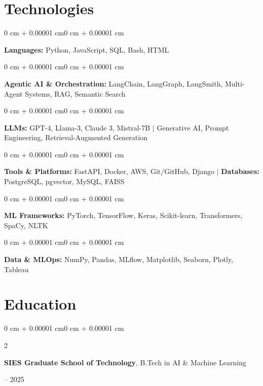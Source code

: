 \documentclass[10pt, letterpaper]{article}
\newenvironment{onecolentry}{
    \begin{adjustwidth}{0 cm + 0.00001 cm}{0 cm + 0.00001 cm}
}{
    \end{adjustwidth}
}
\newenvironment{twocolentry}[2][]{
    \onecolentry
    \def\secondColumn{#2}
    \setcolumnwidth{\fill, 4.5 cm}
    \begin{paracol}{2}
}{
    \switchcolumn \raggedleft \secondColumn
    \end{paracol}
    \endonecolentry
}
\begin{document}
    \section{Technologies}

        \begin{onecolentry}
            \textbf{Languages:} Python, JavaScript, SQL, Bash, HTML
        \end{onecolentry}
        \vspace{0.06 cm}
        \begin{onecolentry}
            \textbf{Agentic AI \& Orchestration:} LangChain, LangGraph, LangSmith, Multi-Agent Systems, RAG, Semantic Search
        \end{onecolentry}
        \vspace{0.06 cm}
        \begin{onecolentry}
            \textbf{LLMs:} GPT-4, Llama-3, Claude 3, Mistral-7B $|$ Generative AI, Prompt Engineering, Retrieval-Augmented Generation
        \end{onecolentry}
        \vspace{0.06 cm}
        \begin{onecolentry}
            \textbf{Tools \& Platforms:} FastAPI, Docker, AWS, Git/GitHub, Django $|$ \textbf{Databases:} PostgreSQL, pgvector, MySQL, FAISS
        \end{onecolentry}
        \vspace{0.06 cm}
        \begin{onecolentry}
            \textbf{ML Frameworks:} PyTorch, TensorFlow, Keras, Scikit-learn, Transformers, SpaCy, NLTK
        \end{onecolentry}
        \vspace{0.06 cm}
        \begin{onecolentry}
            \textbf{Data \& MLOps:} NumPy, Pandas, MLflow, Matplotlib, Seaborn, Plotly, Tableau
        \end{onecolentry}

    \section{Education}

        \begin{twocolentry}{2021 -- 2025}
            \textbf{SIES Graduate School of Technology}, B.Tech in AI \& Machine Learning
        \end{twocolentry}
\end{document}
